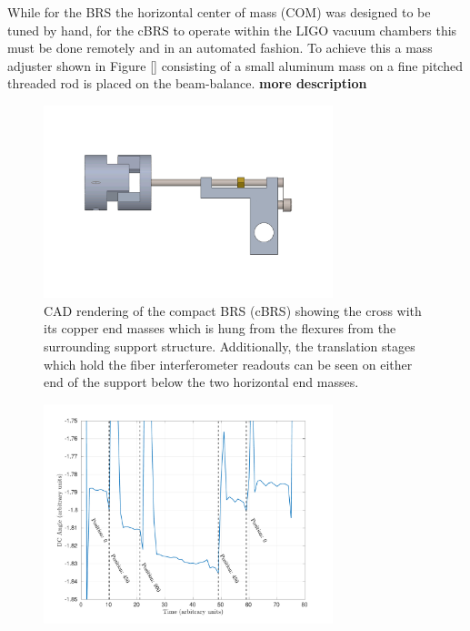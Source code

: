 \documentclass [12pt, proquest]{uwthesis}[2019]
\begin{document}
While for the BRS the horizontal center of mass (COM) was designed to be tuned by hand, for the cBRS to operate within the LIGO vacuum chambers this must be done remotely and in an automated fashion. To achieve this a mass adjuster shown in Figure \ref{} consisting of a small aluminum mass on a fine pitched threaded rod is placed on the beam-balance. \textbf{more description}

\begin{figure}[!h]
\begin{center}
\includegraphics[width=0.75\textwidth]{cBRSMassAdjuster.png}
\end{center}
\caption{CAD rendering of the compact BRS (cBRS) showing the cross with its copper end masses which is hung from the flexures from the surrounding support structure. Additionally, the translation stages which hold the fiber interferometer readouts can be seen on either end of the support below the two horizontal end masses.}
\end{figure}

\begin{figure}[!h]
\begin{center}
\includegraphics[width=0.75\textwidth]{cBRS_massAdjust.pdf}
\end{center}
\caption{}
\end{figure}
\end{document}
